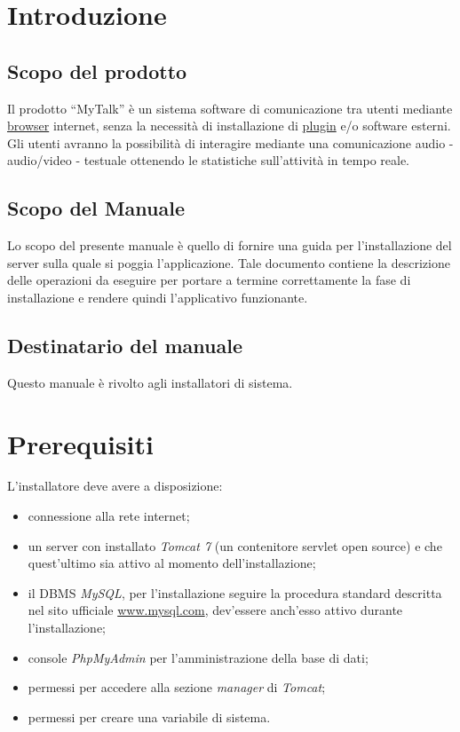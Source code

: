 

\setcounter{page}{1}
\pagestyle{normal}

\section{Introduzione}
\subsection{Scopo del prodotto}
Il prodotto ``MyTalk'' è un sistema software di comunicazione tra utenti mediante \underline{browser} internet, senza la necessità di installazione di \underline{plugin} e/o software esterni. Gli utenti avranno la possibilità di interagire mediante una comunicazione audio - audio/video - testuale ottenendo le statistiche sull'attività in tempo reale.

\subsection{Scopo del Manuale}
Lo scopo del presente manuale è quello di fornire una guida per l'installazione del server sulla quale si poggia l'applicazione. Tale documento contiene la descrizione delle operazioni da eseguire per portare a termine correttamente la fase di installazione e rendere quindi l'applicativo funzionante.

\subsection{Destinatario del manuale}
Questo manuale è rivolto agli installatori di sistema.

\section{Prerequisiti}
L'installatore deve avere a disposizione:
\begin{itemize}
\item connessione alla rete internet;
\item un server con installato \textit{Tomcat 7} (un contenitore servlet open source) e che quest'ultimo sia attivo al momento dell'installazione;
\item il DBMS \textit{MySQL}, per l'installazione seguire la procedura standard descritta nel sito ufficiale \url{www.mysql.com}, dev'essere anch'esso attivo durante l'installazione;
\item console \textit{PhpMyAdmin} per l'amministrazione della base di dati;
\item permessi per accedere alla sezione \textit{manager} di \textit{Tomcat};
\item permessi per creare una variabile di sistema.
\end{itemize} 

